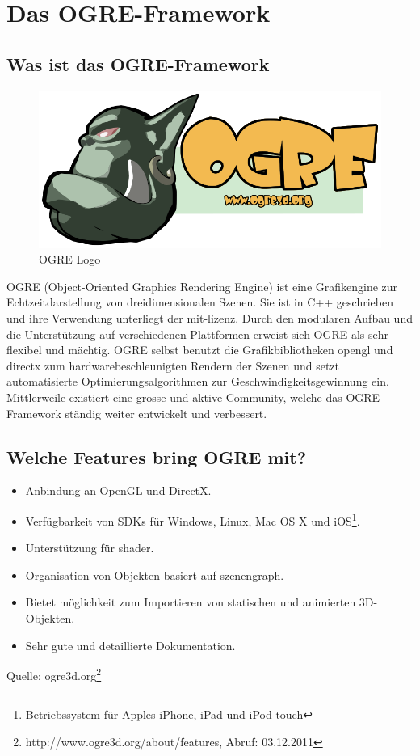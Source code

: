 \section{Das OGRE-Framework}

\subsection{Was ist das OGRE-Framework}

\begin{figure}
	\includegraphics[width=1\linewidth]{src/OgreLogo.png}
	\caption{OGRE Logo} %
	\label{OGRE Logo} %
\end{figure}

OGRE (Object-Oriented Graphics Rendering Engine) ist eine Grafikengine zur Echtzeitdarstellung von dreidimensionalen Szenen. Sie ist in C++ geschrieben und ihre Verwendung unterliegt der \gls{mit-lizenz}. Durch den modularen Aufbau und die Unterstützung auf verschiedenen Plattformen erweist sich OGRE als sehr flexibel und mächtig. OGRE selbst benutzt die Grafikbibliotheken \gls{opengl} und \gls{directx} zum hardwarebeschleunigten Rendern der Szenen und setzt automatisierte Optimierungsalgorithmen zur Geschwindigkeitsgewinnung ein. Mittlerweile existiert eine grosse und aktive Community, welche das OGRE-Framework ständig weiter entwickelt und verbessert.

\subsection{Welche Features bring OGRE mit?}

\begin{itemize}
	\item Anbindung an OpenGL und DirectX.
	\item Verfügbarkeit von SDKs für Windows, Linux, Mac OS X und iOS\footnote{Betriebssystem für Apples iPhone, iPad und iPod touch}.
	\item Unterstützung für \gls{shader}.
	\item Organisation von Objekten basiert auf \gls{szenengraph}.
	\item Bietet möglichkeit zum Importieren von statischen und animierten 3D-Objekten.
	\item Sehr gute und detaillierte Dokumentation.
\end{itemize}
Quelle: ogre3d.org\footnote{http://www.ogre3d.org/about/features, Abruf: 03.12.2011}

